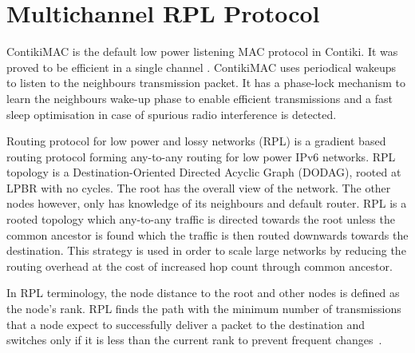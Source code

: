 \section{Multichannel RPL Protocol}

ContikiMAC \cite{contikimac} is the default low power listening MAC protocol in Contiki. It was proved to be efficient in a single channel \cite{micmac}\cite{orpl}. ContikiMAC uses periodical wakeups to listen to the neighbours transmission packet. It has a phase-lock mechanism to learn the neighbours wake-up phase to enable efficient transmissions and a fast sleep optimisation in case of spurious radio interference is detected.

Routing protocol for low power and lossy networks (RPL) is a gradient based routing protocol forming any-to-any routing for low power IPv6 networks. RPL topology is a Destination-Oriented Directed Acyclic Graph (DODAG), rooted at LPBR with no cycles. The root has the overall view of the network. The other nodes however, only has knowledge of its neighbours and default router. RPL is a rooted topology which any-to-any traffic is directed towards the root unless the common ancestor is found which the traffic is then routed downwards towards the destination. This strategy is used in order to scale large networks by reducing the routing overhead at the cost of increased hop count through common ancestor. %

In RPL terminology, the node distance to the root and other nodes is defined as the node's rank. RPL finds the path with the minimum number of transmissions that a node expect to successfully deliver a packet to the destination and switches only if it is less than the current rank to prevent frequent changes~\cite{mrhof}.


